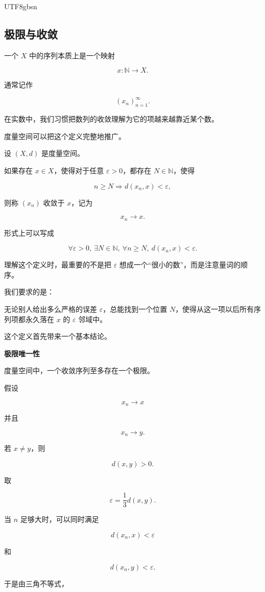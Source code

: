 \documentclass[11pt]{article}
\begin{document}
\begin{CJK*}{UTF8}{gbsn}
\subsection{极限与收敛}

一个 $X$ 中的序列本质上是一个映射

\[
x:\mathbb{N}\rightarrow X.
\]

通常记作

\[
(x_{n})^{\infty}_{n=1}.
\]

在实数中，我们习惯把数列的收敛理解为它的项越来越靠近某个数。

度量空间可以把这个定义完整地推广。

设 $(X,d)$ 是度量空间。

如果存在 $x\in X$，使得对于任意 $\varepsilon>0$，都存在 $N\in\mathbb{N}$，使得

\[
n\geq N\Longrightarrow d(x_{n},x)<\varepsilon,
\]

则称 $(x_{n})$ 收敛于 $x$，记为

\[
x_{n}\rightarrow x.
\]

形式上可以写成

\[
\forall\varepsilon>0,\ \exists N\in\mathbb{N},\ \forall n\geq N,\ d(x_{n},x)<\varepsilon.
\]

理解这个定义时，最重要的不是把 $\varepsilon$ 想成一个“很小的数”，而是注意量词的顺序。

我们要求的是：

无论别人给出多么严格的误差 $\varepsilon$，总能找到一个位置 $N$，使得从这一项以后所有序列项都永久落在 $x$ 的 $\varepsilon$ 邻域中。

这个定义首先带来一个基本结论。

\textbf{极限唯一性}

度量空间中，一个收敛序列至多存在一个极限。

假设

\[
x_{n}\rightarrow x
\]

并且

\[
x_{n}\rightarrow y.
\]

若 $x\ne y$，则

\[
d(x,y)>0.
\]

取

\[
\varepsilon=\frac{1}{3}d(x,y).
\]

当 $n$ 足够大时，可以同时满足

\[
d(x_{n},x)<\varepsilon
\]

和

\[
d(x_{n},y)<\varepsilon.
\]

于是由三角不等式，


\end{CJK*}
\end{document}
